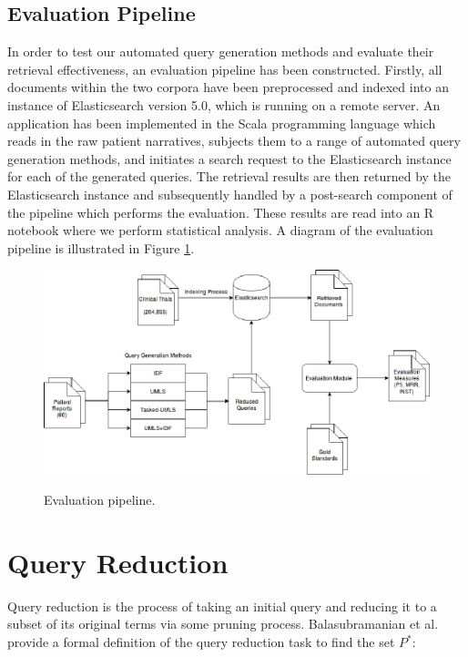 \documentclass[a4paper]{report}
\begin{document}
\section{Evaluation Pipeline}
In order to test our automated query generation methods and evaluate their retrieval effectiveness, an evaluation pipeline has been constructed. Firstly, all documents within the two corpora have been preprocessed and indexed into an instance of Elasticsearch version 5.0, which is running on a remote server. An application has been implemented in the Scala programming language which reads in the raw patient narratives, subjects them to a range of automated query generation methods, and initiates a search request to the Elasticsearch instance for each of the generated queries. The retrieval results are then returned by the Elasticsearch instance and subsequently handled by a post-search component of the pipeline which performs the evaluation. These results are read into an R notebook where we perform statistical analysis. A diagram of the evaluation pipeline is illustrated in Figure \ref{eval-pipeline}.

\begin{figure}
\centering
\caption{Evaluation pipeline.}
\includegraphics[width=1\columnwidth]{pipeline}
\label{eval-pipeline}
\end{figure}



\chapter{Query Reduction}
Query reduction is the process of taking an initial query and reducing it to a subset of its original terms via some pruning process. Balasubramanian et al.~\citep{Balasubramanian:2010:ERL:1835449.1835545} provide a formal definition of the query reduction task to find the set $P^*$:
\end{document}
